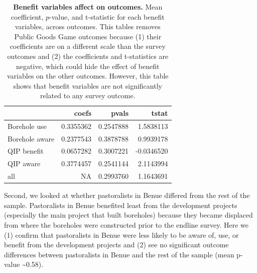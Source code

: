 \documentclass[
]{article}
\begin{document}
\begin{table}[H]
\begin{center}
\label{tab:benefitVar_df_svy_tab}
\caption{\textbf{Benefit variables affect on outcomes.} Mean coefficient, $p$-value, and t-statistic for each benefit variables, across outcomes. This tables removes Public Goods Game outcomes because (1) their coefficients are on a different scale than the survey outcomes and (2) the coefficients and t-statistics are negative, which could hide the effect of benefit variables on the other outcomes. However, this table shows that benefit variables are not significantly related to any survey outcome.}
\smallskip

\begin{tabular}{l|r|r|r}
\hline
  & coefs & pvals & tstat\\
\hline
Borehole use & 0.3355362 & 0.2547888 & 1.5838113\\
\hline
Borehole aware & 0.2377543 & 0.3878788 & 0.9939178\\
\hline
QIP benefit & 0.0657282 & 0.3007221 & -0.0346520\\
\hline
QIP aware & 0.3774457 & 0.2541144 & 2.1143994\\
\hline
all & NA & 0.2993760 & 1.1643691\\
\hline
\end{tabular}


\end{center}
\end{table}

Second, we looked at whether pastoralists in Benue differed from the
rest of the sample. Pastoralists in Benue benefited least from the
development projects (especially the main project that built boreholes)
because they became displaced from where the boreholes were constructed
prior to the endline survey. Here we (1) confirm that pastoralists in
Benue were less likely to be aware of, use, or benefit from the
development projects and (2) see no significant outcome differences
between pastoralists in Benue and the rest of the sample (mean p-value
\textasciitilde0.58).
\end{document}

